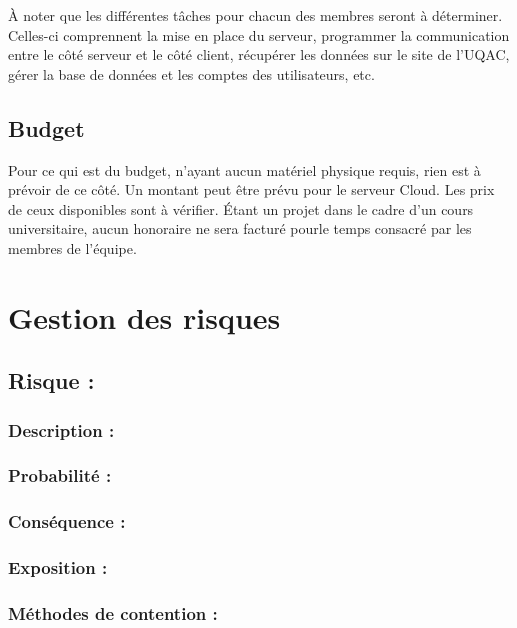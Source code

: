 \documentclass[12pt]{article}
\begin{document}
À noter que les différentes tâches pour chacun des membres seront à déterminer. Celles-ci comprennent la mise en place du serveur, programmer la communication entre le côté serveur et le côté client, récupérer les données sur le site de l'UQAC, gérer la base de données et les comptes des utilisateurs, etc.

\subsection{Budget}

Pour ce qui est du budget, n'ayant aucun matériel physique requis, rien est à prévoir de ce côté. Un montant peut être prévu pour le serveur Cloud. Les prix de ceux disponibles sont à vérifier. Étant un projet dans le cadre d'un cours universitaire, aucun honoraire ne sera facturé pourle temps consacré par les membres de l'équipe.

\newpage

\section{Gestion des risques}


\subsection{Risque :}

\subsubsection*{Description :}

\subsubsection*{Probabilité :}

\subsubsection*{Conséquence :}

\subsubsection*{Exposition :}

\subsubsection*{Méthodes de contention :}
\end{document}
